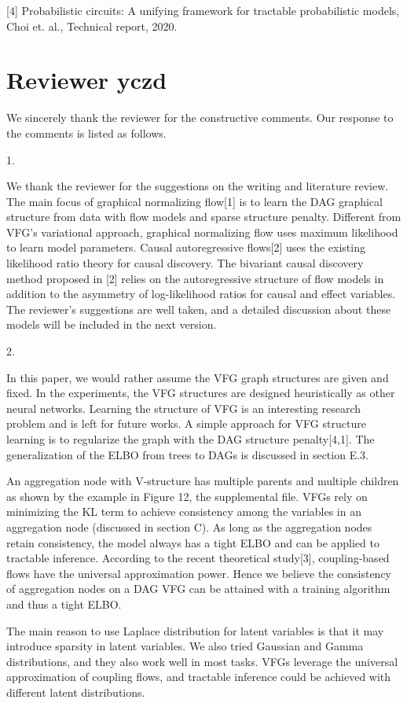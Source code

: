 \documentclass{article}
\begin{document}
 [4] Probabilistic circuits: A unifying framework for tractable probabilistic models, Choi et. al., Technical report, 2020.
 
 \section{Reviewer yczd}
We sincerely thank the reviewer for the constructive comments. Our response to the comments is listed as follows. 

1. 

We thank the reviewer for the suggestions on the writing and literature review.  The main focus of graphical normalizing flow[1] is to learn the DAG graphical structure from data with flow models and sparse structure penalty. Different from VFG's variational approach, graphical normalizing flow uses maximum likelihood to learn model parameters. Causal autoregressive flows[2]  uses the existing likelihood ratio theory for causal discovery. The bivariant causal discovery method proposed in [2] relies on the autoregressive structure of flow models in addition to the asymmetry of log-likelihood ratios for causal and effect variables.
 The reviewer's suggestions are well taken, and a detailed discussion about these models will be included in the next version. 


 2.
 
 In this paper,  we would rather assume the VFG graph structures are given and fixed.  In the experiments, the VFG structures are designed heuristically as other neural networks.  Learning the structure of VFG is an interesting research problem and is left for future works. A simple approach for VFG structure learning is to regularize the graph with the DAG structure penalty[4,1]. The generalization of the ELBO from trees to DAGs is discussed in section E.3. 
 
 An aggregation node with V-structure has multiple parents and multiple children as shown by the example in  Figure 12, the supplemental file. VFGs rely on minimizing the KL term to achieve consistency among the variables in an aggregation node (discussed in section C). As long as the aggregation nodes retain consistency, the model always has a tight ELBO and can be applied to tractable inference. According to the recent theoretical study[3], coupling-based flows have the universal approximation power. Hence we believe the consistency of aggregation nodes on a DAG VFG can be attained with a training algorithm and thus a tight ELBO. 

The main reason to use Laplace distribution for latent variables is that it may introduce sparsity in latent variables. We also tried Gaussian and Gamma distributions, and they also work well in most tasks. VFGs leverage the universal approximation of coupling flows, and tractable inference could be achieved with different latent distributions. 
 
\end{document}
